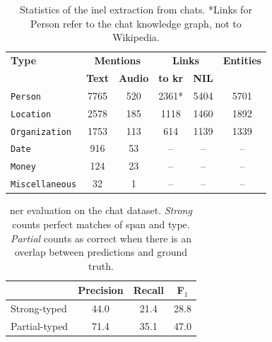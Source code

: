 \begin{table}[htbp]
    \centering
    \begin{tabular}{l|cc|cc|c}
      \toprule
      \textbf{Type} & \multicolumn{2}{c|}{\textbf{Mentions}} & \multicolumn{2}{c|}{\textbf{Links}} & \textbf{Entities} \\
      & \textbf{Text}  & \textbf{Audio} & \textbf{to \ac{kr}} & \textbf{NIL} & \\
      \midrule
      \texttt{Person} & 7765 & 520 & 2361* & 5404 & 5701 \\
      \texttt{Location} & 2578 & 185 & 1118 & 1460 & 1892 \\
      \texttt{Organization} & 1753 & 113 & 614 & 1139 & 1339 \\
      \texttt{Date} & 916 & 53 & -- & -- & -- \\
      \texttt{Money} & 124 & 23 & -- & -- & -- \\
      \texttt{Miscellaneous} & 32 & 1 & -- & -- & -- \\
      \bottomrule
    \end{tabular}
    \caption[Statistics of the \ac{inel} extraction from chats.]{Statistics of the \ac{inel} extraction from chats. *Links for Person refer to the chat knowledge graph, not to Wikipedia.}
    \label{tab:stats}
\end{table}

\begin{table}[htbp]
    \centering
    \begin{tabular}{lccc}
      \toprule
      & \textbf{Precision} & \textbf{Recall} & \textbf{F$_1$} \\
      \midrule
      Strong-typed & 44.0 & 21.4 & 28.8 \\
      Partial-typed & 71.4 & 35.1 & 47.0 \\
      \bottomrule
    \end{tabular}
    \caption[\ac{ner} evaluation on the chat dataset.]{\ac{ner} evaluation on the chat dataset. \textit{Strong} counts perfect matches of span and type. \textit{Partial} counts as correct when there is an overlap between predictions and ground truth.}
    \label{tab:eval}
\end{table}




